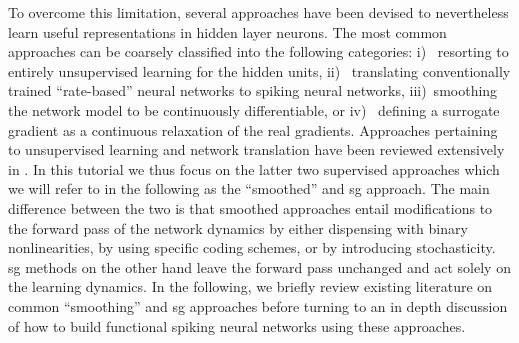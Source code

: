 \documentclass[journal,onecolumn,11pt]{IEEEtran}
\begin{document}
To overcome this limitation, several approaches have been devised to nevertheless
learn useful representations in hidden layer neurons.
The most common approaches can be coarsely classified into the following
categories: 
i)  ~resorting to entirely unsupervised learning for the hidden units, 
ii) ~translating conventionally trained ``rate-based'' neural networks to spiking neural networks,
iii)~smoothing the network model to be continuously differentiable, or 
iv) ~defining a surrogate gradient as a continuous relaxation of the real
gradients.  
Approaches pertaining to unsupervised learning and network translation have been reviewed extensively in \cite{tavanaei_deep_2018}. 
In this tutorial we thus focus on the latter two supervised approaches which we will refer to in the following as the ``smoothed'' and \gls{sg} approach.
The main difference between the two is that smoothed approaches entail modifications to the forward pass of the network dynamics by either dispensing with binary nonlinearities, by using specific coding schemes, or by introducing stochasticity.  
\Gls{sg} methods on the other hand leave the forward pass unchanged and act solely on the learning dynamics. 
In the following, we briefly review existing literature on common ``smoothing'' and \gls{sg} approaches before turning to an in depth discussion of how to build functional spiking neural networks using these approaches. 
%
%
%
%
%
\end{document}

